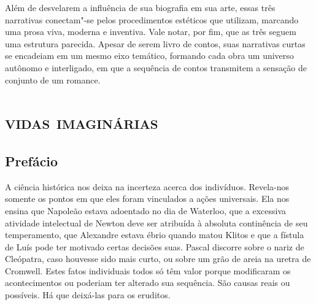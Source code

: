 Além de desvelarem a influência de sua biografia em sua arte, essas três narrativas conectam"-se pelos procedimentos estéticos que utilizam, marcando uma prosa viva, moderna e inventiva. Vale notar, por fim, que as três seguem uma estrutura parecida. Apesar de serem livro de contos, suas narrativas curtas se encadeiam em um mesmo eixo temático, formando cada obra um universo autônomo e interligado, em que a sequência de contos transmitem a sensação de conjunto de um romance.

\part{\textsc{vidas imaginárias}}

\chapter{Prefácio}


A ciência histórica nos deixa na incerteza acerca dos indivíduos.
Revela-nos somente os pontos em que eles foram vinculados a ações
universais. Ela nos ensina que Napoleão estava adoentado no dia de
Waterloo, que a excessiva atividade intelectual de Newton deve ser
atribuída à absoluta continência de seu temperamento, que Alexandre estava
ébrio quando matou Klitos e que a fístula de Luís  pode ter motivado
certas decisões suas. Pascal discorre sobre o nariz de Cleópatra, caso
houvesse sido mais curto, ou sobre um grão de areia na uretra de Cromwell.
Estes fatos individuais todos só têm valor porque modificaram os
acontecimentos ou poderiam ter alterado sua sequência. São causas reais ou
possíveis. Há que deixá-las para os eruditos.

